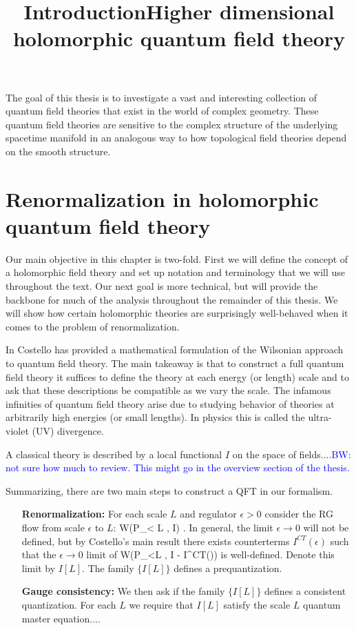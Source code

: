 \documentclass[10pt]{amsart}
\title{Introduction}
\title{Higher dimensional holomorphic quantum field theory}
\def\brian{\textcolor{blue}{BW: }\textcolor{blue}}
\begin{document}
\maketitle

The goal of this thesis is to investigate a vast and interesting collection of quantum field theories that exist in the world of complex geometry. 
These quantum field theories are sensitive to the complex structure of the underlying spacetime manifold in an analogous way to how topological field theories depend on the smooth structure. 

\section{Renormalization in holomorphic quantum field theory}

Our main objective in this chapter is two-fold. 
First we will define the concept of a holomorphic field theory and set up notation and terminology that we will use throughout the text. 
Our next goal is more technical, but will provide the backbone for much of the analysis throughout the remainder of this thesis.
We will show how certain holomorphic theories are surprisingly well-behaved when it comes to the problem of renormalization. 

In \cite{CostelloRenormalization} Costello has provided a mathematical formulation of the Wilsonian approach to quantum field theory.
The main takeaway is that to construct a full quantum field theory it suffices to define the theory at each energy (or length) scale and to ask that these descriptions be compatible as we vary the scale.
The infamous infinities of quantum field theory arise due to studying behavior of theories at arbitrarily high energies (or small lengths). 
In physics this is called the ultra-violet (UV) divergence. 

A classical theory is described by a local functional $I$ on the space of fields....\brian{not sure how much to review. This might go in the overview section of the thesis.}

Summarizing, there are two main steps to construct a QFT in our formalism.
\begin{itemize}
\item[{\bf Renormalization:}] For each scale $L$ and regulator $\epsilon > 0$ consider the RG flow from scale $\epsilon$ to $L$:
\be
W(P_{\epsilon < L} , I) .
\ee
In general, the limit $\epsilon \to 0$ will not be defined, but by Costello's main result there exists counterterms $I^{CT}(\epsilon)$ such that the $\epsilon \to 0$ limit of 
\ben
W(P_{\epsilon<L} , I - I^{CT}(\epsilon))
\een
is well-defined. 
Denote this limit by $I[L]$.
The family $\{I[L]\}$ defines a prequantization.
\item[{\bf Gauge consistency:}] We then ask if the family $\{I[L]\}$ defines a consistent quantization.
For each $L$ we require that $I[L]$ satisfy the scale $L$ quantum master equation....
\end{itemize}
\end{document}
